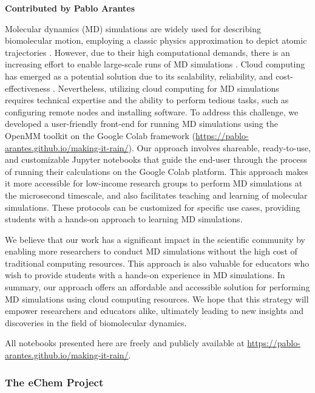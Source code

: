 \documentclass[9pt,review]{livecoms}
\begin{document}
\textbf{Contributed by Pablo Arantes}

Molecular dynamics (MD) simulations are widely used for describing biomolecular motion, employing a classic physics approximation to depict atomic trajectories \cite{Liu2017,Hollingsworth2018}. However, due to their high computational demands, there is an increasing effort to enable large-scale runs of MD simulations \cite{Hollingsworth2018}. Cloud computing has emerged as a potential solution due to its scalability, reliability, and cost-effectiveness \cite{Ebejer2013}. Nevertheless, utilizing cloud computing for MD simulations requires technical expertise and the ability to perform tedious tasks, such as configuring remote nodes and installing software. To address this challenge, we developed a user-friendly front-end for running MD simulations \cite{Arantes2021} using the OpenMM toolkit \cite{Eastman2017} on the Google Colab framework \cite{colab,Bisong2019} (\url{https://pablo-arantes.github.io/making-it-rain/}). Our approach involves shareable, ready-to-use, and customizable Jupyter notebooks that guide the end-user through the process of running their calculations on the Google Colab platform. This approach makes it more accessible for low-income research groups to perform MD simulations at the microsecond timescale, and also facilitates teaching and learning of molecular simulations. These protocols can be customized for specific use cases, providing students with a hands-on approach to learning MD simulations.

We believe that our work has a significant impact in the scientific community by enabling more researchers to conduct MD simulations without the high cost of traditional computing resources. This approach is also valuable for educators who wish to provide students with a hands-on experience in MD simulations. In summary, our approach offers an affordable and accessible solution for performing MD simulations using cloud computing resources. We hope that this strategy will empower researchers and educators alike, ultimately leading to new insights and discoveries in the field of biomolecular dynamics.

All notebooks presented here are freely and publicly available at  \url{https://pablo-arantes.github.io/making-it-rain/}.

\subsubsection{The eChem Project}
\end{document}
